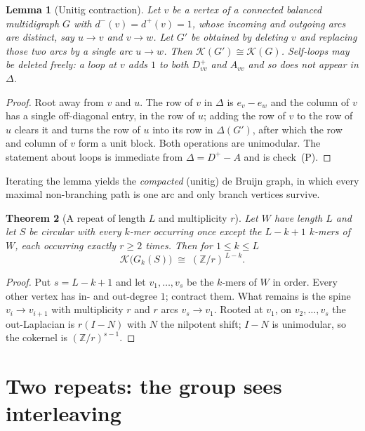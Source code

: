 \documentclass[11pt]{article}
\theoremstyle{plain}
\newtheorem{theorem}{Theorem}
\newtheorem{lemma}[theorem]{Lemma}
\theoremstyle{definition}
\theoremstyle{remark}
\newcommand{\Z}{\mathbb{Z}}
\newcommand{\K}{\mathcal{K}}
\begin{document}
\begin{lemma}[Unitig contraction]\label{lem:contract}
Let $v$ be a vertex of a connected balanced multidigraph $G$ with $d^{-}(v)=d^{+}(v)=1$,
whose incoming and outgoing arcs are distinct, say $u\to v$ and $v\to w$. Let $G'$ be
obtained by deleting $v$ and replacing those two arcs by a single arc $u\to w$. Then
$\K(G')\cong\K(G)$. Self-loops may be deleted freely: a loop at $v$ adds $1$ to both
$D^{+}_{vv}$ and $A_{vv}$ and so does not appear in $\Delta$.
\end{lemma}

\begin{proof}
Root away from $v$ and $u$. The row of $v$ in $\Delta$ is $e_v-e_w$ and the column of $v$
has a single off-diagonal entry, in the row of $u$; adding the row of $v$ to the row of $u$
clears it and turns the row of $u$ into its row in $\Delta(G')$, after which the row and
column of $v$ form a unit block. Both operations are unimodular. The statement about loops
is immediate from $\Delta=D^{+}-A$ and is check~(P).
\end{proof}

Iterating the lemma yields the \emph{compacted} (unitig) de Bruijn graph, in which every
maximal non-branching path is one arc and only branch vertices survive.

\begin{theorem}[A repeat of length $L$ and multiplicity $r$]\label{thm:repeat}
Let $W$ have length $L$ and let $S$ be circular with every $k$-mer occurring once except
the $L-k+1$ $k$-mers of $W$, each occurring exactly $r\ge2$ times. Then for $1\le k\le L$
\[
\K\bigl(G_k(S)\bigr)\;\cong\;(\Z/r)^{\,L-k}.
\]
\end{theorem}

\begin{proof}
Put $s=L-k+1$ and let $v_1,\dots,v_s$ be the $k$-mers of $W$ in order. Every other vertex
has in- and out-degree $1$; contract them. What remains is the spine $v_i\to v_{i+1}$ with
multiplicity $r$ and $r$ arcs $v_s\to v_1$. Rooted at $v_1$, on $v_2,\dots,v_s$ the
out-Laplacian is $r(I-N)$ with $N$ the nilpotent shift; $I-N$ is unimodular, so the
cokernel is $(\Z/r)^{s-1}$.
\end{proof}

\section{Two repeats: the group sees interleaving}\label{sec:interleave}
\end{document}
